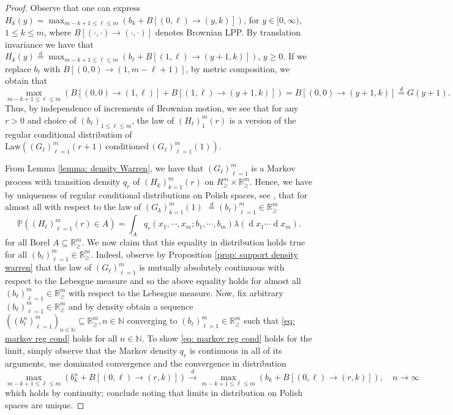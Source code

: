 \documentclass[11pt, reqno]{amsart}
\numberwithin{equation}{section}
\newcommand{\N}{\ensuremath{\mathbb{N}}}
\newcommand{\R}{\ensuremath{\mathbb{R}}}
\newcommand{\PP}{\ensuremath{\mathbb{P}}}
\newcommand{\diff}{\ensuremath{\operatorname{d}\!}}
\begin{document}
\begin{proof}
    Observe that one can express $H_k(y) = \max_{m-k+1\le \ell \le m}(b_{k} + B[(0,\ell)\to (y, k)])$, for $y\in [0,\infty)$, $1\le k \le m$, where $B[(\cdot, \cdot)\to (\cdot, \cdot)]$ denotes Brownian LPP. By translation invariance we have that $H_k(y) \stackrel{d}{=}\max_{m-k+1\le \ell \le m}(b_{\ell} + B[(1,\ell)\to (y+1, k)])$, $y\ge 0$. If we replace $b_{\ell}$ with $B[(0, 0)\to (1, m-\ell+1)]$, by metric composition, we obtain that \[
    \max_{m-k+1\le \ell \le m}(B[(0, 0)\to (1, \ell )] + B[(1,\ell)\to (y+1, k)]) = B[(0, 0)\to (y+1, k)] \stackrel{d}{=}G(y+1).
    \]
    Thus, by independence of increments of Brownian motion, we see that for any $r>0$ and choice of $(b_\ell)_{1\le \ell\le m}$, the law of $(H_\ell)_{1}^m(r)$ is a version of the regular conditional distribution of $\mathrm{Law}\left((G_\ell)_{\ell =1}^m(r + 1)\,\text{conditioned}\, (G_\ell)_{\ell =1}^m(1)\right)$.
    
    From Lemma \ref{lemma: density Warren}, we have that $(G_\ell)_{\ell =1}^m$ is a Markov process with transition density $q_r$ of $(H_k)_{k=1}^{m}(r) $ on $R^m_\ge \times \R^m_\ge$. Hence, we have by uniqueness of regular conditional distributions on Polish spaces, see \cite{kallenberg1997foundations}, that for almost all with respect to the law of $(G_k)_{k=1}^{m}(1)$ $\stackrel{d}{=}(b_\ell)_{\ell = 1}^m\in \R^m_\ge $
    \begin{equation*}\label{eq: markov reg cond}
        \PP((H_\ell)_{\ell=1}^m(r)\in A) =  \displaystyle\int_A q_r(x_1, \cdots, x_m; b_1, \cdots, b_m)\lambda(\diff x_1\cdots \diff x_m).
    \end{equation*}
    for all Borel $A\subseteq \R^m_\ge$. We now claim that this equality in distribution holds true for all $(b_\ell)_{\ell = 1}^m\in \R^m_\ge$. Indeed, observe by Proposition \ref{prop: support density warren} that the law of $(G_\ell)_{\ell = 1}^m$ is mutually absolutely continuous with respect to the Lebesgue measure and so the above equality holds for almost all $(b_\ell)_{\ell = 1}^m\in \R^m_\ge$ with respect to the Lebesgue measure. Now, fix arbitrary $(b_\ell)_{\ell = 1}^m\in \R^m_\ge$ and by density obtain a sequence $((b^n_\ell)_{\ell = 1}^m)_{n\in\N}\subseteq \R^m_\ge, n\in \N$ converging to $(b_\ell)_{\ell = 1}^m\in \R^m_\ge$ such that \eqref{eq: markov reg cond} holds for all $n\in \N$. To show \eqref{eq: markov reg cond} holds for the limit, simply observe that the Markov density $q_r$ is continuous in all of its arguments, use dominated convergence and the convergence in distribution 
    \begin{equation*}
        \max_{m-k+1\le \ell \le m}(b^n_{k} + B[(0,\ell)\to (r, k)]) \stackrel{d}{\longrightarrow}  \max_{m-k+1\le \ell \le m}(b_{k} + B[(0,\ell)\to (r, k)]),\quad n\to \infty
    \end{equation*}
    which holds by continuity; conclude noting that limits in distribution on Polish spaces are unique.
\end{proof}
\end{document}
